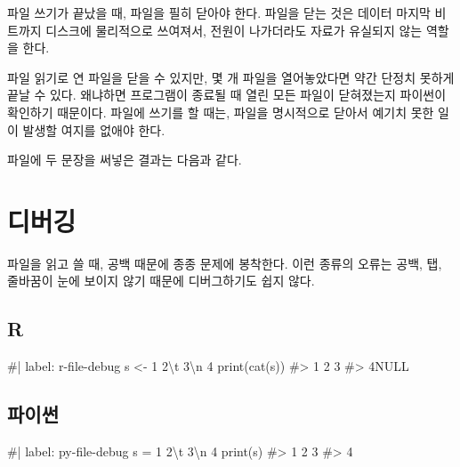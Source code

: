 \documentclass[
  letterpaper,
]{book}
\newenvironment{Shaded}{\begin{snugshade}}{\end{snugshade}}
\newcommand{\NormalTok}[1]{\textcolor[rgb]{0.00,0.23,0.31}{#1}}
\newcommand{\SpecialCharTok}[1]{\textcolor[rgb]{0.37,0.37,0.37}{#1}}
\newcommand{\StringTok}[1]{\textcolor[rgb]{0.13,0.47,0.30}{#1}}
\begin{document}
파일 쓰기가 끝났을 때, 파일을 필히 닫아야 한다. 파일을 닫는 것은 데이터
마지막 비트까지 디스크에 물리적으로 쓰여져서, 전원이 나가더라도 자료가
유실되지 않는 역할을 한다.

파일 읽기로 연 파일을 닫을 수 있지만, 몇 개 파일을 열어놓았다면 약간
단정치 못하게 끝날 수 있다. 왜냐하면 프로그램이 종료될 때 열린 모든
파일이 닫혀졌는지 파이썬이 확인하기 때문이다. 파일에 쓰기를 할 때는,
파일을 명시적으로 닫아서 예기치 못한 일이 발생할 여지를 없애야 한다.

파일에 두 문장을 써넣은 결과는 다음과 같다.

\begin{Shaded}
\end{Shaded}

 

\section{디버깅}\label{r-file-debug}

 

파일을 읽고 쓸 때, 공백 때문에 종종 문제에 봉착한다. 이런 종류의 오류는
공백, 탭, 줄바꿈이 눈에 보이지 않기 때문에 디버그하기도 쉽지 않다.

\subsection{R}

\begin{Shaded}
\begin{Highlighting}[]
\NormalTok{\#| label: r{-}file{-}debug}
\NormalTok{s \textless{}{-} \textquotesingle{}1 2\textbackslash{}t 3\textbackslash{}n 4\textquotesingle{}}
\NormalTok{print(cat(s))}
\NormalTok{\#\textgreater{} 1 2   3}
\NormalTok{\#\textgreater{}  4NULL}
\end{Highlighting}
\end{Shaded}

\subsection{파이썬}

\begin{Shaded}
\begin{Highlighting}[]
\NormalTok{\#| label: py{-}file{-}debug}
\NormalTok{s = \textquotesingle{}1 2\textbackslash{}t 3\textbackslash{}n 4\textquotesingle{}}
\NormalTok{print(s)}
\NormalTok{\#\textgreater{} 1 2  3}
\NormalTok{\#\textgreater{}  4}
\end{Highlighting}
\end{Shaded}
\end{document}
